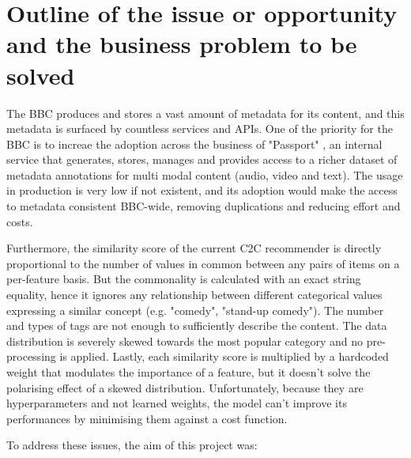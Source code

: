 
\section{Outline of the issue or opportunity and the business problem to be solved}

The BBC produces and stores a vast amount of metadata for its content, and this metadata is surfaced by countless services and APIs.
One of the priority for the BBC is to increae the adoption across the business of "Passport" \cite{BbcPassportMetadata}, an internal service that generates,
stores, manages and provides access to a richer dataset of metadata annotations for multi modal content (audio, video and text).
The usage in production is very low if not existent, and its adoption would make the access to metadata consistent BBC-wide,
removing duplications and reducing effort and costs.

Furthermore, the similarity score of the current C2C recommender is directly proportional to the number of values in common between any pairs of items
on a per-feature basis. But the commonality is calculated with an exact string equality, hence it ignores any relationship between different
categorical values expressing a similar concept (e.g. "comedy", "stand-up comedy"). The number and types of tags are not enough to sufficiently
describe the content. The data distribution is severely skewed towards the most popular category and no pre-processing
is applied. Lastly, each similarity score
is multiplied by a hardcoded weight that modulates the importance of a feature, but it doesn't solve the polarising effect of a
skewed distribution. Unfortunately, because they are hyperparameters and not learned weights, the model can't improve
its performances by minimising them against a cost function.

To address these issues, the aim of this project was:

